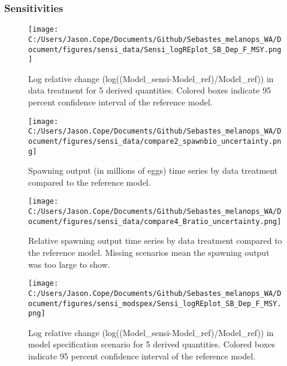 \documentclass[11pt,
  english,
  letterpaper,
]{article}
\begin{document}
\pagebreak

\hypertarget{sensitivities}{%
\subsubsection{Sensitivities}\label{sensitivities}}

\begin{figure}
\centering
\texttt{[image: C:/Users/Jason.Cope/Documents/Github/Sebastes\_melanops\_WA/Document/figures/sensi\_data/Sensi\_logREplot\_SB\_Dep\_F\_MSY.png]}
\caption{Log relative change (log((Model\_sensi-Model\_ref)/Model\_ref)) in data treatment for 5 derived quantities. Colored boxes indicate 95 percent confidence interval of the reference model.\label{fig:sensi-data-RE}}
\end{figure}

\pagebreak

\begin{figure}
\centering
\texttt{[image: C:/Users/Jason.Cope/Documents/Github/Sebastes\_melanops\_WA/Document/figures/sensi\_data/compare2\_spawnbio\_uncertainty.png]}
\caption{Spawning output (in millions of eggs) time series by data treatment compared to the reference model.\label{fig:sensi-data-ssb}}
\end{figure}

\pagebreak

\begin{figure}
\centering
\texttt{[image: C:/Users/Jason.Cope/Documents/Github/Sebastes\_melanops\_WA/Document/figures/sensi\_data/compare4\_Bratio\_uncertainty.png]}
\caption{Relative spawning output time series by data treatment compared to the reference model. Missing scenarios mean the spawning output was too large to show.\label{fig:sensi-data-depl}}
\end{figure}

\pagebreak

\begin{figure}
\centering
\texttt{[image: C:/Users/Jason.Cope/Documents/Github/Sebastes\_melanops\_WA/Document/figures/sensi\_modspex/Sensi\_logREplot\_SB\_Dep\_F\_MSY.png]}
\caption{Log relative change (log((Model\_sensi-Model\_ref)/Model\_ref)) in model specification scenario for 5 derived quantities. Colored boxes indicate 95 percent confidence interval of the reference model.\label{fig:sensi-modspec-RE}}
\end{figure}
\end{document}
